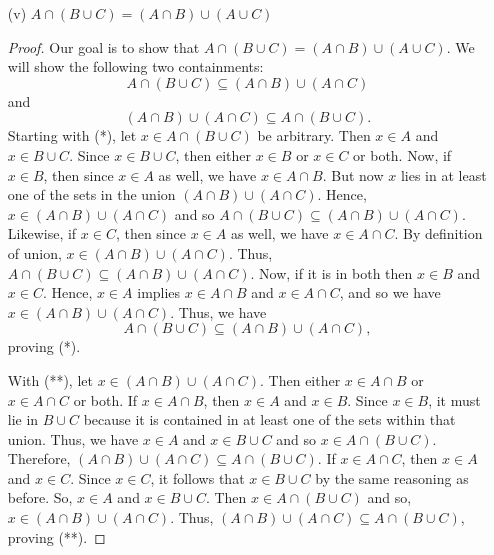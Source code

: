\documentclass[a4paper]{article}
\begin{document}
\begin{enumerate}
\begin{proof}
        \end{proof}    
    \item[(v)] \( A \cap (B \cup C) = (A \cap B) \cup (A \cup C ) \)
        \begin{proof}
        Our goal is to show that \( A \cap (B \cup C) = (A \cap B) \cup (A \cup C) \). We will show the following two containments:   
        \[  A \cap (B \cup C ) \subseteq  (A \cap B) \cup (A \cap C) \tag{*} \]
        and
        \[  (A \cap B) \cup (A \cap C) \subseteq A \cap (B \cup C). \tag{**} \]
        Starting with (*), let \( x \in A \cap (B \cup C) \) be arbitrary. Then \( x \in A  \) and \( x \in B \cup C \). Since \( x \in B \cup C  \), then either \( x \in B  \) or \( x \in C \) or both. Now, if \( x \in B \), then since \( x \in A  \) as well, we have \( x \in A \cap B \). But now \( x  \) lies in at least one of the sets in the union \( (A \cap B) \cup (A \cap C) \). Hence, \( x \in (A \cap B) \cup (A \cap C) \) and so \( A \cap (B \cup C) \subseteq  (A \cap B) \cup (A \cap C) \). Likewise, if \( x \in C  \), then since \( x \in A  \) as well, we have \( x \in A \cap C  \). By definition of union, \( x \in (A \cap  B) \cup (A \cap C) \). Thus, \( A \cap (B \cup C) \subseteq (A \cap B) \cup (A \cap C)  \). Now, if it is in both then \( x \in B  \) and \( x \in C  \). Hence, \( x \in A  \) implies \( x \in A \cap B  \) and \( x \in A \cap C  \), and so we have \( x \in (A \cap B) \cup (A \cap C) \). Thus, we have   
        \[  A \cap (B \cup C ) \subseteq  (A \cap B) \cup (A \cap C ), \]
        proving (*).

        With (**), let \( x \in (A \cap B) \cup (A \cap C) \). Then either \( x \in A \cap B \) or \( x \in A \cap C  \) or both. If \( x \in A \cap B \), then \( x \in A  \) and \( x \in B  \). Since \( x \in B \), it must lie in \( B \cup C  \) because it is contained in at least one of the sets within that union. Thus, we have \( x \in A  \) and \( x \in B \cup C  \) and so \( x \in A \cap (B \cup C) \). Therefore, \( (A \cap B) \cup (A \cap C) \subseteq A \cap (B \cup C) \). If \( x \in A \cap C \), then \( x \in A  \) and \( x \in C  \). Since \( x \in C  \), it follows that \( x \in B \cup C  \) by the same reasoning as before. So, \( x \in A  \) and \( x \in B \cup C  \). Then \( x \in A \cap (B \cup C) \) and so, \( x \in (A \cap B) \cup (A \cap C) \). Thus, \( (A \cap B) \cup (A \cap C) \subseteq A \cap (B \cup C) \), proving (**).


\end{proof}
\end{enumerate}
\end{document}
